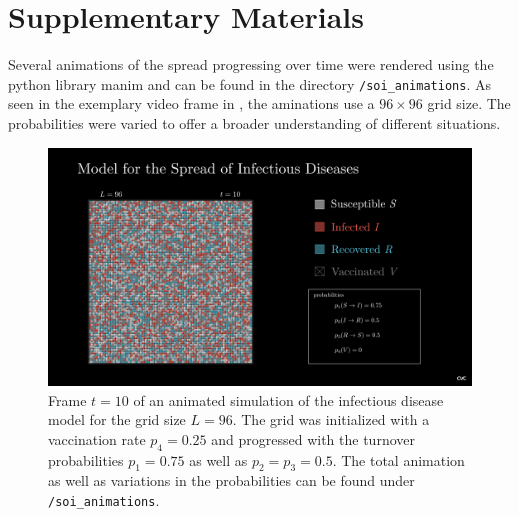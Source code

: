 \section{Supplementary Materials}


Several animations of the spread progressing over time were rendered using the python library manim\cite{pypi_manim} and can be found in the directory \texttt{/soi\_animations}. 
As seen in the exemplary video frame in , the aminations use a $96\times 96$ grid size. The probabilities were varied to offer a broader understanding of different situations.

\begin{figure}[ht]
    \centering
    \includegraphics[width=1\textwidth]{images/soi_main_scene_75_50_50_25_t10.png}
    \caption{Frame $t=10$ of an animated simulation of the infectious disease model for the grid size $L=96$. The grid was initialized with a vaccination rate $p_4=0.25$ and progressed with 
    the turnover probabilities $p_1=0.75$ as well as $p_2=p_3=0.5$. The total animation as well as variations in the probabilities can be found under \texttt{/soi\_animations}.}\label{fig:apx_animation_inf_t}
\end{figure}